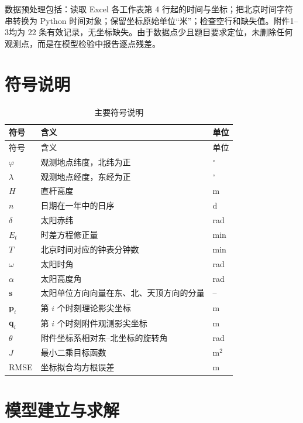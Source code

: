 \documentclass[UTF8,a4paper,12pt]{ctexart}
\begin{document}
数据预处理包括：读取 Excel 各工作表第 4 行起的时间与坐标；把北京时间字符串转换为 Python 时间对象；保留坐标原始单位“米”；检查空行和缺失值。附件1--3均为 22 条有效记录，无坐标缺失。由于数据点少且题目要求定位，未删除任何观测点，而是在模型检验中报告逐点残差。

\section{符号说明}
\begin{longtable}{p{}p{}p{}}
\caption{主要符号说明}\\
\toprule
符号 & 含义 & 单位\\
\midrule
\endfirsthead
\toprule
符号 & 含义 & 单位\\
\midrule
\endhead
$\varphi$ & 观测地点纬度，北纬为正 & $^\circ$\\
$\lambda$ & 观测地点经度，东经为正 & $^\circ$\\
$H$ & 直杆高度 & m\\
$n$ & 日期在一年中的日序 & d\\
$\delta$ & 太阳赤纬 & rad\\
$E_t$ & 时差方程修正量 & min\\
$T$ & 北京时间对应的钟表分钟数 & min\\
$\omega$ & 太阳时角 & rad\\
$\alpha$ & 太阳高度角 & rad\\
$\mathbf{s}$ & 太阳单位方向向量在东、北、天顶方向的分量 & --\\
$\mathbf{p}_i$ & 第 $i$ 个时刻理论影尖坐标 & m\\
$\mathbf{q}_i$ & 第 $i$ 个时刻附件观测影尖坐标 & m\\
$\theta$ & 附件坐标系相对东--北坐标的旋转角 & rad\\
$J$ & 最小二乘目标函数 & m$^2$\\
RMSE & 坐标拟合均方根误差 & m\\
\bottomrule
\end{longtable}

\section{模型建立与求解}
\end{document}
